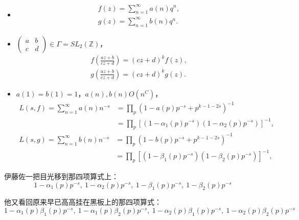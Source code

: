 \begin{itemize}
    \item {} \begin{gather*}
    f(z)=\sum_{n=1}^{\infty}a(n)q^n,\\
    g(z)=\sum_{n=1}^{\infty}b(n)q^n.
    \end{gather*}
    \item {} \(\begin{pmatrix}a&b\\c&d\end{pmatrix}\in\Gamma=SL_2(\mathbb{Z})\)，\begin{gather*}
    f\left(\frac{az+b}{cz+d}\right)=(cz+d)^k f(z),\\
    g\left(\frac{az+b}{cz+d}\right)=(cz+d)^k g(z).
    \end{gather*}
    \item {} \(a(1)=b(1)=1\)，\(a(n),b(n)\)\(O(n^C)\)，
\begin{align*}
L(s,f)=\sum_{n=1}^{\infty}a(n)n^{-s}
&=\prod_p(1-a(p)p^{-s}+p^{k-1-2s})^{-1} \\
&=\prod_p[(1-\alpha_1(p)p^{-s})(1-\alpha_2(p)p^{-s})]^{-1},
\end{align*}
\begin{align*}
L(s,g)=\sum_{n=1}^{\infty}b(n)n^{-s}
&=\prod_p(1-b(p)p^{-s}+p^{k-1-2s})^{-1} \\
&=\prod_p[(1-\beta_1(p)p^{-s})(1-\beta_2(p)p^{-s})]^{-1},
\end{align*}
\end{itemize}

伊藤佐一把目光移到那四项算式上：\[1-\alpha_1(p)p^{-s},\ 1-\alpha_2(p)p^{-s},\ 1-\beta_1(p)p^{-s},\ 1-\beta_2(p)p^{-s}\]

他又看回原来早已高高挂在黑板上的那四项算式：\[1-\alpha_1(p)\beta_1(p)p^{-s},\ 1-\alpha_1(p)\beta_2(p)p^{-s},\ 1-\alpha_2(p)\beta_1(p)p^{-s},\ 1-\alpha_2(p)\beta_2(p)p^{-s}\]


